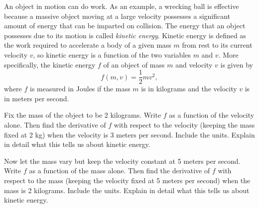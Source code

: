 \begin{pa} \label{PA:10.2} An object in motion can do work. As an example, a wrecking ball is effective because a massive object moving at a large velocity possesses a significant amount of energy that can be imparted on collision. The energy that an object possesses due to its motion is called \emph{kinetic energy}. Kinetic energy is defined as the work required to accelerate a body of a given mass $m$ from rest to its current velocity $v$, so kinetic energy is a function of the two variables $m$ and $v$. More specifically, the kinetic energy $f$ of an object of mass $m$ and velocity $v$ is given by
\[f(m,v) = \frac{1}{2}mv^2,\]
where $f$ is measured in Joules if the mass $m$ is in kilograms and the velocity $v$ is in meters per second.
    \ba
    \item Fix the mass of the object to be 2 kilograms. Write $f$ as a function of the velocity alone. Then find the derivative of $f$ with respect to the velocity (keeping the mass fixed at 2 kg) when the velocity is 3 meters per second. Include the units. Explain in detail what this tells us about kinetic energy.

\begin{comment}

If the mass $m$ is fixed at 2 kilograms, then
\[f = f(2,v) = v^2\]
is a function of $v$ alone. So
\[\frac{d}{dv} f(2,v) = 2v,\]
and
\[\frac{d}{dv} f(2,v)\bigm|_{v=3} = 6 \ \frac{\text{Joules}}{\text{meters/second}}.\]
This last calculation tells us that if we increase the velocity by 1 meter per second when the velocity is 3 meters per second and the mass is 2 kilograms, then the kinetic energy increases by approximately 6 Joules.

\end{comment}

    \item Now let the mass vary but keep the velocity constant at 5 meters per second. Write $f$ as a function of the mass alone. Then find the derivative of $f$ with respect to the mass (keeping the velocity fixed at 5 meters per second) when the mass is 2 kilograms. Include the units. Explain in detail what this tells us about kinetic energy.

\begin{comment}

If the velocity $v$ is fixed at 5 meters per second, then
\[f = f(m,5) = 12.5m\]
is a function of $m$ alone. So
\[\frac{d}{dm} f(m,5) = 12.5,\]
and
\[\frac{d}{dv} f(m,5)\bigm|_{m=2} = 12.5 \ \frac{\text{Joules}}{\text{kilogram}}.\]
This last calculation tells us that if we increase the mass by 1 kilogram when the mass is 2 kilograms and the velocity is 5 meters per second, then the kinetic energy increases by approximately 12.5 Joules.

\end{comment}

    \ea


\end{pa} \afterpa 